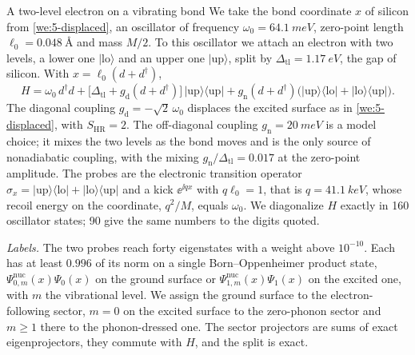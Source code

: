 \begin{workedexample}{A two-level electron on a vibrating bond}\label{we:8-sectors}
We take the bond coordinate $x$ of silicon from \cref{we:5-displaced}, an oscillator of frequency $\omega_0 = \SI{64.1}{meV}$, zero-point length $\ell_0 = \SI{0.048}{\angstrom}$ and mass $M/2$. To this oscillator we attach an electron with two levels, a lower one $|\mathrm{lo}\rangle$ and an upper one $|\mathrm{up}\rangle$, split by $\Delta_{\mathrm{tl}} = \SI{1.17}{eV}$, the gap of silicon. With $x = \ell_0(d + d^\dagger)$,
\begin{equation*}
  H = \omega_0\,d^\dagger d + \bigl[\Delta_{\mathrm{tl}} + g_{\mathrm{d}}(d + d^\dagger)\bigr]\,|\mathrm{up}\rangle\langle\mathrm{up}| + g_{\mathrm{n}}(d + d^\dagger)\bigl(|\mathrm{up}\rangle\langle\mathrm{lo}| + |\mathrm{lo}\rangle\langle\mathrm{up}|\bigr) .
\end{equation*}
The diagonal coupling $g_{\mathrm{d}} = -\sqrt2\,\omega_0$ displaces the excited surface as in \cref{we:5-displaced}, with $S_{\mathrm{HR}} = 2$. The off-diagonal coupling $g_{\mathrm{n}} = \SI{20}{meV}$ is a model choice; it mixes the two levels as the bond moves and is the only source of nonadiabatic coupling, with the mixing $g_{\mathrm{n}}/\Delta_{\mathrm{tl}} = 0.017$ at the zero-point amplitude. The probes are the electronic transition operator $\sigma_x = |\mathrm{up}\rangle\langle\mathrm{lo}| + |\mathrm{lo}\rangle\langle\mathrm{up}|$ and a kick $\ee^{\ii qx}$ with $q\ell_0 = 1$, that is $q = \SI{41.1}{keV}$, whose recoil energy on the coordinate, $q^2/M$, equals $\omega_0$. We diagonalize $H$ exactly in 160 oscillator states; 90 give the same numbers to the digits quoted.

\emph{Labels.} The two probes reach forty eigenstates with a weight above $10^{-10}$. Each has at least $0.996$ of its norm on a single Born--Oppenheimer product state, $\Psi^{\mathrm{nuc}}_{0,m}(x)\Psi_0(x)$ on the ground surface or $\Psi^{\mathrm{nuc}}_{1,m}(x)\Psi_1(x)$ on the excited one, with $m$ the vibrational level. We assign the ground surface to the electron-following sector, $m = 0$ on the excited surface to the zero-phonon sector and $m \ge 1$ there to the phonon-dressed one. The sector projectors are sums of exact eigenprojectors, they commute with $H$, and the split is exact.


\end{workedexample}
